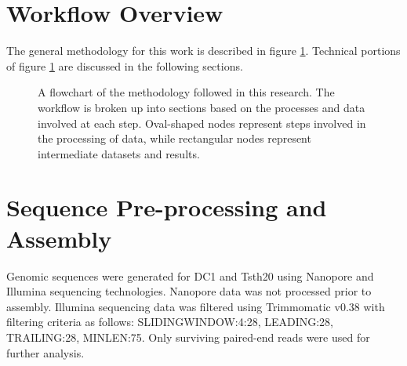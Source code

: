 \section{Workflow Overview}

The general methodology for this work is described in figure
\ref{fig:workflow}. Technical portions of figure \ref{fig:workflow}
are discussed in the following sections.

\begin{figure}
  \centering
  \caption{A flowchart of the methodology followed in this
    research. The workflow is broken up into sections based on the
    processes and data involved at each step. Oval-shaped nodes
    represent steps involved in the processing of data, while
    rectangular nodes represent intermediate datasets and results.}
  \label{fig:workflow}
\end{figure}


\section{Sequence Pre-processing and Assembly}


Genomic sequences were generated for DC1 and Tsth20 using
Nanopore\cite{Wang2021} and Illumina\cite{Bennett2004} sequencing
technologies. Nanopore data was not processed prior to
assembly. Illumina sequencing data was filtered using Trimmomatic
v0.38\cite{Bolger2014} with filtering criteria as follows:
SLIDINGWINDOW:4:28, LEADING:28, TRAILING:28, MINLEN:75. Only surviving
paired-end reads were used for further analysis.

